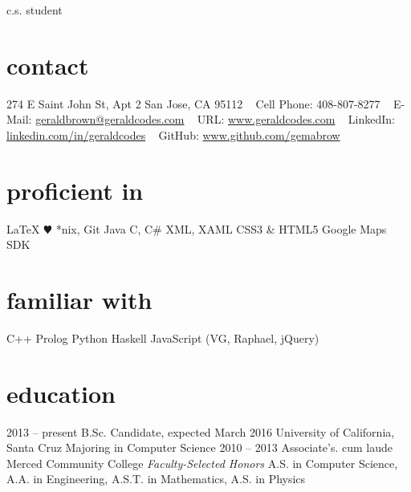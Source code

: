 \documentclass[]{./friggeri-cv}
\begin{document}
       {c.s. student}

\begin{aside}
  \section{contact}
    \hspace{-3em}274 E Saint John St, Apt 2
    San Jose, CA 95112
    ~
    {Cell Phone: 408-807-8277} 
    ~ 
    E-Mail: \href{mailto:geraldbrown@geraldcodes.com}{\hspace{-5em}geraldbrown@geraldcodes.com}
    ~
    URL: \href{http://www.geraldcodes.com}{www.geraldcodes.com}
    ~ 
    LinkedIn: \href{http://linkedin.com/in/geraldcodes}{\hspace{-3em}linkedin.com/in/geraldcodes}
    ~
    GitHub: \href{http://www.github.com/gemabrow}{\hspace{-3em}www.github.com/gemabrow}
  \section{proficient in}
    \LaTeX
   {\color{red} $\varheartsuit$} %
    *nix, Git
    Java
    C, C\#
    XML, XAML
    CSS3 \& HTML5
    Google Maps SDK
 \section{familiar with}
    C++
    Prolog
    Python
    Haskell
    JavaScript
    (VG, Raphael, jQuery)
\end{aside}
\section{education}
\begin{entrylist}
  \entry
    {2013 -- present}
    {B.Sc. {\normalfont Candidate, expected March 2016}}
    {University of California, Santa Cruz}
    {Majoring in Computer Science}
  \entry
    {2010 -- 2013}
    {Associate's. cum laude}
    {Merced Community College}
    {\emph{Faculty-Selected Honors} A.S. in Computer Science,
    \\A.A. in Engineering, A.S.T. in Mathematics, A.S. in Physics}
\end{entrylist}
\end{document}
